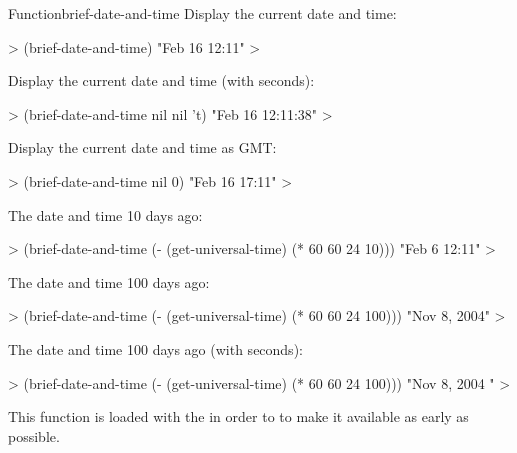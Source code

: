 \documentclass[10pt,twoside,english,pdftex]{article}
\begin{document}
\begin{functiondoc}{Function}{brief-date-and-time}{%
     
    \returns{} }
\fnexamples
Display the current date and time: 
%
\W\supp
\begin{example}
  > (brief-date-and-time)
  "Feb 16 12:11"
  >
\end{example}
%
Display the current date and time (with seconds):
%
\W\supp\notpretop
\begin{example}
  > (brief-date-and-time nil nil 't)
  "Feb 16 12:11:38"
  >
\end{example}
%
Display the current date and time as GMT: 
%
\W\supp\notpretop
\begin{example}
  > (brief-date-and-time nil 0)
  "Feb 16 17:11"
  >
\end{example}
%
The date and time 10 days ago:
%
\W\supp\notpretop
\begin{example}
  > (brief-date-and-time (- (get-universal-time) (* 60 60 24 10)))
  "Feb 6 12:11"
  >
\end{example}
%
The date and time 100 days ago:
%
\W\supp\notpretop
\begin{example}
  > (brief-date-and-time (- (get-universal-time) (* 60 60 24 100)))
  "Nov  8, 2004"
  >
\end{example}
%
The date and time 100 days ago (with seconds):
%
\W\supp\notpretop
\begin{example}
  > (brief-date-and-time (- (get-universal-time) (* 60 60 24 100)))
  "Nov  8, 2004   "
  >
\end{example}

\fnnote
{}%
%
%
This function is loaded with the  
in order to to make it available as early as possible.

\end{functiondoc}

\end{document}
